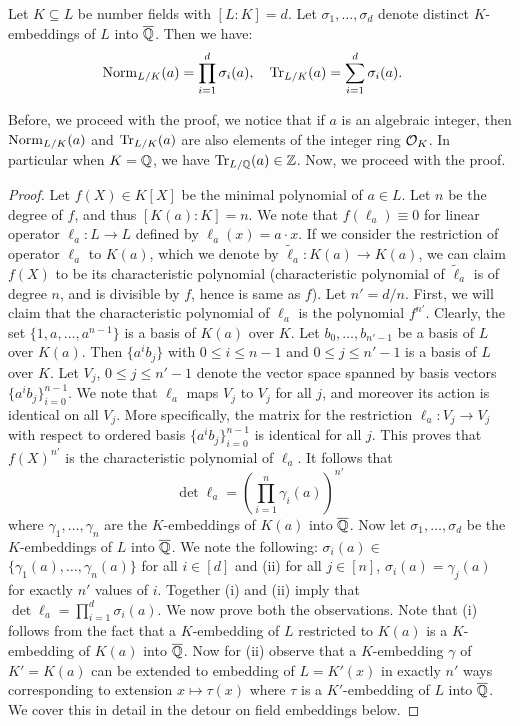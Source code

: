 \documentclass[11pt]{article}
\begin{document}
\begin{lemma}\label{lem:norm-and-trace}
Let $K\subseteq L$ be number fields with $[L:K]=d$. Let $\sigma_1,\ldots,\sigma_d$ denote distinct $K$-embeddings
of $L$ into $\overline{\mathbb{Q}}$. Then we have:
\begin{align*}
\mathrm{Norm}_{L/{K}}(a) = \prod_{i=1}^d \sigma_i(a), \quad \mathrm{Tr}_{L/{K}}(a) &= \sum_{i=1}^d \sigma_i(a).
\end{align*}
\end{lemma}
Before, we proceed with the proof, we notice that if $a$ is an algebraic integer, then $\mathrm{Norm}_{L/{K}}(a)$
and $\mathrm{Tr}_{L/{K}}(a)$ are also elements of the integer ring $\mathcal{O}_{K}$. In particular when
$K=\mathbb{Q}$, we have $\mathrm{Tr}_{L/{\mathbb{Q}}}(a)\in \mathbb{Z}$.
Now, we proceed with the proof.
\begin{proof}
Let $f(X)\in K[X]$ be the minimal polynomial of $a\in L$. Let $n$ be the degree of $f$, and
thus $[K(a): K]=n$. We note that $f(\ell_a)\equiv 0$ for linear operator $\ell_a: L\rightarrow L$
defined by $\ell_a(x)=a\cdot x$. If we consider the restriction of operator $\ell_a$ to $K(a)$, which
we denote by $\tilde{\ell}_a: K(a)\rightarrow K(a)$, we can claim  $f(X)$ to be its characteristic
polynomial (characteristic polynomial of $\tilde{\ell}_a$ is of degree $n$, and is divisible
by $f$, hence is same as $f$). Let $n'=d/n$. First, we will claim that the characteristic polynomial
of $\ell_a$ is the polynomial $f^{n'}$. Clearly, the set $\{1,a,\ldots,a^{n-1}\}$ is a basis of $K(a)$
over $K$. Let $b_0,\ldots,b_{n'-1}$ be a basis of $L$ over $K(a)$. Then $\{a^ib_j\}$ with $0\leq i\leq n-1$
and $0\leq j\leq n'-1$ is a basis of $L$ over $K$. Let $V_j$, $0\leq j\leq n'-1$
denote the vector space spanned by basis vectors $\{a^ib_j\}_{i=0}^{n-1}$. We note that $\ell_a$ maps $V_j$ to
$V_j$ for all $j$, and moreover its action is identical on all $V_j$. More specifically, the matrix for the
restriction $\ell_a: V_j\rightarrow V_j$ with respect to ordered basis $\{a^ib_j\}_{i=0}^{n-1}$ is identical
for all $j$. This proves that $f(X)^{n'}$ is the characteristic polynomial of $\ell_a$. It follows that
\begin{equation}\label{eq:det-la}
\det{\ell_a} = \left(\prod_{i=1}^n \gamma_i(a)\right)^{n'}
\end{equation}
where $\gamma_1,\ldots,\gamma_n$ are the $K$-embeddings of $K(a)$ into $\overline{\mathbb{Q}}$. Now let $\sigma_1,\ldots,
\sigma_d$ be the $K$-embeddings of $L$ into $\overline{\mathbb{Q}}$. We note the following: $\sigma_i(a)\in$
$\{\gamma_1(a),\ldots,\gamma_n(a)\}$ for all $i\in [d]$ and (ii) for all $j\in [n]$, $\sigma_i(a)=\gamma_j(a)$
for exactly $n'$
values of $i$. Together (i) and (ii) imply that $\det{\ell_a}=\prod_{i=1}^d \sigma_i(a)$. We now prove both the
observations. Note that (i) follows from the fact that a $K$-embedding of $L$ restricted to $K(a)$ is a $K$-embedding
of $K(a)$ into $\overline{\mathbb{Q}}$. Now for (ii) observe that a $K$-embedding $\gamma$ of $K'=K(a)$ can be extended to
embedding of $L=K'(x)$ in exactly $n'$ ways corresponding to extension $x\mapsto \tau(x)$ where $\tau$ is a $K'$-embedding
of $L$ into $\overline{\mathbb{Q}}$. We cover this in detail in the detour on field embeddings below.


\end{proof}
\end{document}
